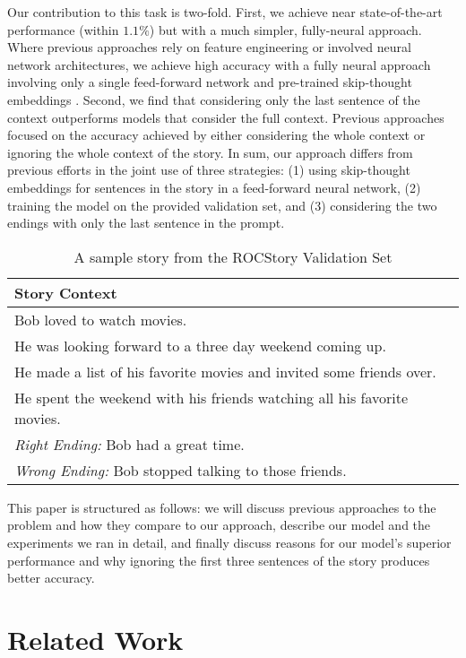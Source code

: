 \documentclass[11pt,a4paper]{article}
\begin{document}
Our contribution to this task is two-fold. 
First, we achieve near state-of-the-art performance (within $1.1\%$) but with a much simpler, fully-neural approach.
Where previous approaches rely on feature engineering or involved neural network architectures, we achieve high accuracy with a fully neural approach involving only a single feed-forward network and pre-trained skip-thought embeddings \citep{kiros2015skip}.
Second, we find that considering only the last sentence of the context outperforms models that consider the full context. Previous approaches focused on the accuracy achieved by either considering the whole context or ignoring the whole context of the story.
In sum, our approach differs from previous efforts in the joint use of three strategies: (1) using skip-thought embeddings \citep{kiros2015skip} for sentences in the story in a feed-forward neural network, (2) training the model on the provided validation set, and (3) considering the two endings with only the last sentence in the prompt. 


\begin{table}[t]
\small
\begin{center}
\begin{tabular}{|p{6 cm}|}
\hline
{\bf Story Context} \\
\hline
Bob loved to watch movies. \\
He was looking forward to a three day weekend coming up. \\
He made a list of his favorite movies and invited some friends over. \\
He spent the weekend with his friends watching all his favorite movies. \\
\hline
\emph{Right Ending:} Bob had a great time. \\
\emph{Wrong Ending:} Bob stopped talking to those friends. \\
\hline
\end{tabular}
\end{center}
\caption{\label{sample} A sample story from the ROCStory Validation Set }
\end{table}

This paper is structured as follows: we will discuss previous approaches to the problem and how they compare to our approach, describe our model and the experiments we ran in detail, and finally discuss reasons for our model's superior performance and why ignoring the first three sentences of the story produces better accuracy.

\section{Related Work}
\end{document}
